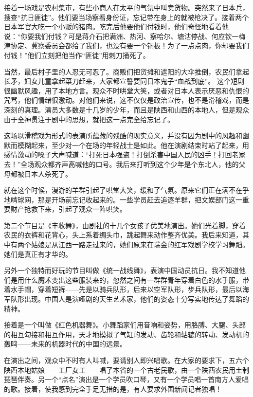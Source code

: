 \documentclass[10pt]{book}
\begin{document}
接着一场戏是农村集市，有些小商人在太平的气氛中叫卖货物。突然来了日本兵，搜查“抗日匪徒”。他们要当场察看身份证，忘记带在身上的就被枪决了。接着两个日本军官大吃一个小贩的猪肉。吃完后他要他们付钱时，他们奇怪地看着他说：“你要我们付钱？可是蒋介石把满洲、热河、察哈尔、塘沽停战、何应钦一梅津协定、冀察委员会都给了我们，也没有要一个铜板！为了一点点肉，你却要我们付钱！”他们立刻把他当作“匪徒”用刺刀捅死了。

当然，最后村子里的人忍无可忍了。商贩们把货摊和遮阳的大伞推倒，农民们拿起长矛，妇女儿童拿起菜刀赶来，大家都宣誓要同日本鬼子“血战到底”。 这个短剧很幽默风趣，用了本地方言。观众不时哄堂大笑，或者对日本人表示厌恶和仇恨的咒骂，他们情绪很激动。对他们来说，这不仅仅是政治宣传，也不是滑稽戏，而是深刻的真理。演员大多数是十几岁的少年，而且是陕西和山西的本地人，但是观众由于全神贯注于剧中的思想，就把这一点完全给忘记了。

这场以滑稽戏为形式的表演所蕴藏的残酷的现实意义，并没有因为剧中的风趣和幽默而模糊起来，至少对一个在场的年轻战士是如此。他在演剧结束时站了起来，用感情激动的嗓子大声喊道：“打死日本强盗！打倒杀害中国人民的凶手！打回老家去！”全场观众都齐声高喊他的口号。我后来打听到这个少年是个东北人，他的父母都被日本人杀死了。

就在这个时候，漫游的羊群引起了哄堂大笑，缓和了气氛。原来它们正在满不在乎地啃球网，那是开场前忘记收起来的。一些学员赶去追逐羊群，把文娱部门这一重要财产抢救下来，引起了观众一阵哄笑。

第二个节目是《丰收舞》，由剧社的十几个女孩子优美地演出。她们光着脚，穿着农民的衣裤和花背心，头上系着绸头巾，跳起舞来动作整齐优美。我后来知道，其中有两个姑娘是从江西一路走过来的，她们原来在瑞金的红军戏剧学校学习舞蹈。她们是真正有才华的。

另外一个独特而好玩的节目叫做《统一战线舞》，表演中国动员抗日。我不知道他们是用什么魔术变出这些服装来的，忽然之间有一群群青年穿着白色的水手服，带着水手帽，穿着短裤——先是以骑兵队形，后来以空军队形，步兵队形，最后以海军队形出现。中国人是演哑剧的天生艺术家，他们的姿态十分写实地传达了舞蹈的精神。

接着是一个叫做《红色机器舞》。小舞蹈家们用音响和姿势，用胳膊、大腿、头部的相互勾接和相互作用，天才地模拟了气缸的发动、齿轮和轱辘的转动、发动机的轰鸣——未来的机器时代的中国的远景。

在演出之间，观众中不时有人叫喊，要请别人即兴唱歌。在大家的要求下，五六个陕西本地姑娘——工厂女工——唱了本省的一个古老民歌，由一个陕西农民用土制琵琶伴奏。另一个“点名”演出是一个学员吹口琴，又有一个学员唱一首南方人爱唱的歌。接着，使我感到完全手足无措的是，有人要求外国新闻记者独唱！
\end{document}
